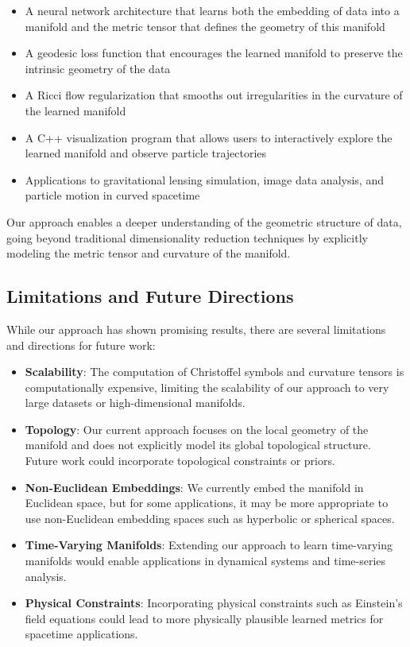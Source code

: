 \documentclass[11pt,a4paper]{article}
\begin{document}
\begin{itemize}
    \item A neural network architecture that learns both the embedding of data into a manifold and the metric tensor that defines the geometry of this manifold
    \item A geodesic loss function that encourages the learned manifold to preserve the intrinsic geometry of the data
    \item A Ricci flow regularization that smooths out irregularities in the curvature of the learned manifold
    \item A C++ visualization program that allows users to interactively explore the learned manifold and observe particle trajectories
    \item Applications to gravitational lensing simulation, image data analysis, and particle motion in curved spacetime
\end{itemize}

Our approach enables a deeper understanding of the geometric structure of data, going beyond traditional dimensionality reduction techniques by explicitly modeling the metric tensor and curvature of the manifold.

\subsection{Limitations and Future Directions}

While our approach has shown promising results, there are several limitations and directions for future work:

\begin{itemize}
    \item \textbf{Scalability}: The computation of Christoffel symbols and curvature tensors is computationally expensive, limiting the scalability of our approach to very large datasets or high-dimensional manifolds.
    
    \item \textbf{Topology}: Our current approach focuses on the local geometry of the manifold and does not explicitly model its global topological structure. Future work could incorporate topological constraints or priors.
    
    \item \textbf{Non-Euclidean Embeddings}: We currently embed the manifold in Euclidean space, but for some applications, it may be more appropriate to use non-Euclidean embedding spaces such as hyperbolic or spherical spaces.
    
    \item \textbf{Time-Varying Manifolds}: Extending our approach to learn time-varying manifolds would enable applications in dynamical systems and time-series analysis.
    
    \item \textbf{Physical Constraints}: Incorporating physical constraints such as Einstein's field equations could lead to more physically plausible learned metrics for spacetime applications.
\end{itemize}
\end{document}
